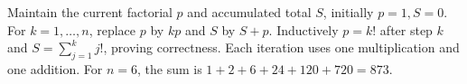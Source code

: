 Maintain the current factorial $p$ and accumulated total $S$, initially $p=1,S=0$. For $k=1,\ldots,n$, replace $p$ by $kp$ and $S$ by $S+p$. Inductively $p=k!$ after step $k$ and $S=\sum_{j=1}^k j!$, proving correctness. Each iteration uses one multiplication and one addition. For $n=6$, the sum is $1+2+6+24+120+720=\boxed{873}$.
